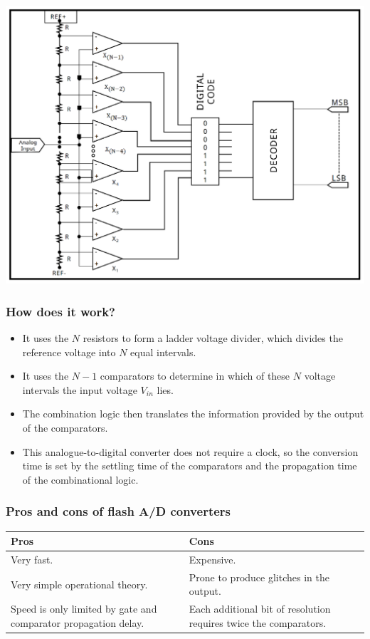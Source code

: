 \documentclass[11pt]{article}
\begin{document}
\begin{center}
\includegraphics[width=.9\linewidth]{./images/flash-a-d-converter-circuit-diagram.png}
\end{center}
\subsubsection{How does it work?}
\label{sec:org6864940}
\begin{itemize}
\item It uses the \(N\) resistors to form a ladder voltage divider, which divides the reference voltage into \(N\) equal intervals.
\item It uses the \(N - 1\) comparators to determine in which of these \(N\) voltage intervals the input voltage \(V_{in}\) lies.
\item The combination logic then translates the information provided by the output of the comparators.
\item This analogue-to-digital converter does not require a clock, so the conversion time is set by the settling time of the comparators and the propagation time of the combinational logic.
\end{itemize}
\subsubsection{Pros and cons of flash A/D converters}
\label{sec:org46f8201}
\begin{center}
\begin{tabularx}{\textwidth}{|X|X|}
\hline
Pros & Cons\\
\hline
Very fast. & Expensive.\\
\hline
Very simple operational theory. & Prone to produce glitches in the output.\\
\hline
Speed is only limited by gate and comparator propagation delay. & Each additional bit of resolution requires twice the comparators.\\
\hline
\end{tabularx}
\end{center}
\end{document}
